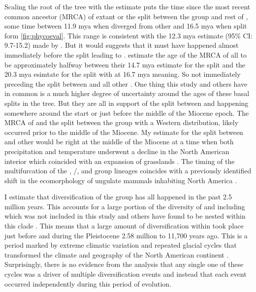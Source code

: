 Scaling the root of the \phycoeval tree with the \cite{feng2017} estimate
puts the time since the most recent common ancestor (MRCA) of extant \anaxyrus 
or the split between the \boreas group and rest of \anaxyrus,  
some time between 11.9 mya when \punctatus diverged from other \anaxyrus and 16.5 mya
when \anaxyrus split form \incilius \cref{fig:phycoeval}.
This range is consistent with the 12.3 mya estimate (95\% CI: 9.7-15.2) 
made by \cite{feng2017}.
But it would suggests that it must have happened almost immediately before the 
split leading to \punctatus. 
\cite{portik2023} estimate the age of the MRCA of all \anaxyrus to be approximately halfway 
between their 14.7 mya estimate for the \punctatus split and the 20.3 mya 
esimtate for the split with \incilius at 16.7 mya meaning. 
So not immediately preceding the split between \punctatus and all other \anaxyrus.
One thing this study and others have in common is a much higher degree of 
uncertainty around the ages of these basal splits in the \anaxyrus tree.
But they are all in support of the split between \incilius and \anaxyrus happening 
somewhere around the start or just before the middle of the Miocene epoch.
The MRCA of \anaxyrus and the split between the \boreas group with a Western 
distribution, likely occurred prior to the middle of the Miocene. 
My estimate for the split between \punctatus and other \anaxyrus would be 
right at the middle of the Miocene at a time when both precipitation and 
temperature underwent a decline in the North American interior which coincided
with an expansion of grasslands \parencite{morales-garcia2020}.
The timing of the multifurcation of the \quercicus, \cognatus/\speciosus, and 
\americanus group lineages coincides with a previously identified shift in the
ecomorphology of ungulate mammals inhabiting North America \parencite{morales-garcia2020}. 

I estimate that diversification of the \americanus group has all happened in the 
past 2.5 million years. This accounts for a large portion of the diversity of  
\anaxyrus and including \houstonensis which was not included in this study and others
have found to be nested within this clade \cite{portik2023,pyron2011}. 
This means that a large amount of diversification within \anaxyrus took place just before  
and during the Pleistocene 2.58 million to 11,700 years ago. 
This is a period marked by extreme climatic variation and repeated glacial cycles 
that transformed the climate and geography of the North American continent \parencite{holman1995,holman2003}.
Surprisingly, there is no evidence from the \phycoeval analysis that any single 
one of these cycles was a driver of multiple diversification events and instead 
that each event occurred independently during this period of \anaxyrus evolution.

